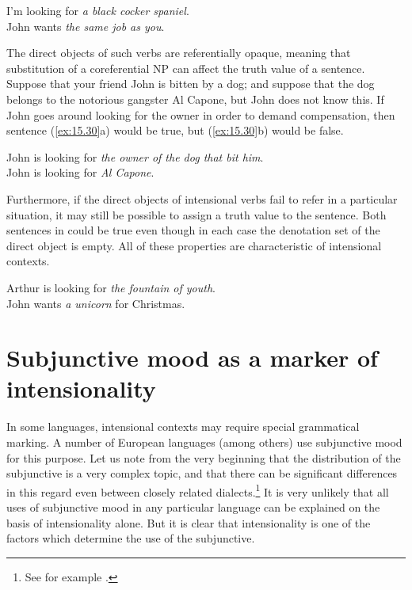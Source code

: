\ea \label{ex:15.29}
\ea \label{ex:15.} I’m looking for \textit{a black cocker spaniel}.\\
\ex John wants \textit{the same job as you}.
                       \z
\z


The direct objects of such verbs are referentially opaque, meaning that substitution of a coreferential NP can affect the truth value of a sentence. Suppose that your friend John is bitten by a dog; and suppose that the dog belongs to the notorious gangster Al Capone, but John does not know this. If John goes around looking for the owner in order to demand compensation, then sentence (\ref{ex:15.30}a) would be true, but (\ref{ex:15.30}b) would be false.


\ea \label{ex:15.30}
\ea \label{ex:15.} John is looking for \textit{the owner of the dog that bit him}.\\
\ex John is looking for \textit{Al Capone}.
                       \z
\z


Furthermore, if the direct objects of intensional verbs fail to refer in a particular situation, it may still be possible to assign a truth value to the sentence. Both sentences in  could be true even though in each case the denotation set of the direct object is empty. All of these properties are characteristic of intensional contexts.


\ea \label{ex:15.31}
\ea \label{ex:15.} Arthur is looking for \textit{the fountain of youth}.\\
\ex John wants \textit{a unicorn} for Christmas.
                       \z
\z

\section{Subjunctive mood as a marker of intensionality}\label{sec:15.5}

In some languages, intensional contexts may require special grammatical marking. A number of European languages (among others) use subjunctive mood for this purpose. Let us note from the very beginning that the distribution of the subjunctive is a very complex topic, and that there can be significant differences in this regard even between closely related dialects.\footnote{See for example \citet{Marques2004}.} It is very unlikely that all uses of subjunctive mood in any particular language can be explained on the basis of intensionality alone. But it is clear that intensionality is one of the factors which determine the use of the subjunctive.



